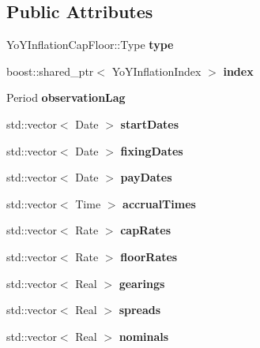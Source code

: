 \subsection*{Public Attributes}
\begin{DoxyCompactItemize}
\item 
Yo\+Y\+Inflation\+Cap\+Floor\+::\+Type {\bfseries type}\label{class_quant_lib_1_1_yo_y_inflation_cap_floor_1_1arguments_ab8de446ac7e4d9391c89601db54d6eb8}

\item 
boost\+::shared\+\_\+ptr$<$ Yo\+Y\+Inflation\+Index $>$ {\bfseries index}\label{class_quant_lib_1_1_yo_y_inflation_cap_floor_1_1arguments_aaee0f9f735a09bbde7fd0e824eb10ce5}

\item 
Period {\bfseries observation\+Lag}\label{class_quant_lib_1_1_yo_y_inflation_cap_floor_1_1arguments_a55c315b302079ca7407408195bbe255d}

\item 
std\+::vector$<$ Date $>$ {\bfseries start\+Dates}\label{class_quant_lib_1_1_yo_y_inflation_cap_floor_1_1arguments_a29ee13e6199ae08be5cc12216a6b5027}

\item 
std\+::vector$<$ Date $>$ {\bfseries fixing\+Dates}\label{class_quant_lib_1_1_yo_y_inflation_cap_floor_1_1arguments_a459c6c352d82a62e35f3ce8188d574f9}

\item 
std\+::vector$<$ Date $>$ {\bfseries pay\+Dates}\label{class_quant_lib_1_1_yo_y_inflation_cap_floor_1_1arguments_af4bfb1081ec4d295ee58372dbcaf8740}

\item 
std\+::vector$<$ Time $>$ {\bfseries accrual\+Times}\label{class_quant_lib_1_1_yo_y_inflation_cap_floor_1_1arguments_a12bb7f0abe0b6a48669d302af9428a6e}

\item 
std\+::vector$<$ Rate $>$ {\bfseries cap\+Rates}\label{class_quant_lib_1_1_yo_y_inflation_cap_floor_1_1arguments_a18b0aeb48ae3e7873d56e9fc6e348d8c}

\item 
std\+::vector$<$ Rate $>$ {\bfseries floor\+Rates}\label{class_quant_lib_1_1_yo_y_inflation_cap_floor_1_1arguments_acafe59441504131a894aaa4360fc6526}

\item 
std\+::vector$<$ Real $>$ {\bfseries gearings}\label{class_quant_lib_1_1_yo_y_inflation_cap_floor_1_1arguments_aebca61380f3f03dec0d2751be92f7348}

\item 
std\+::vector$<$ Real $>$ {\bfseries spreads}\label{class_quant_lib_1_1_yo_y_inflation_cap_floor_1_1arguments_a7ef8912b66b977b24af94e1b96a35ac4}

\item 
std\+::vector$<$ Real $>$ {\bfseries nominals}\label{class_quant_lib_1_1_yo_y_inflation_cap_floor_1_1arguments_ab83477c84a7fa03998c98649ebbe5c26}

\end{DoxyCompactItemize}


